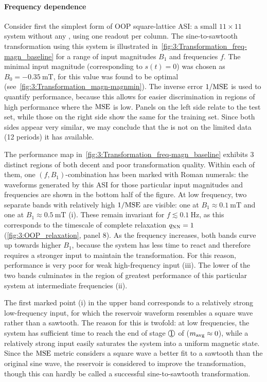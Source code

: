\paragraph{Frequency dependence}
Consider first the simplest form of OOP square-lattice ASI: a small $11 \times 11$ system without any , using one readout per column.
The sine-to-sawtooth transformation using this system is illustrated in~\cref{fig:3:Transformation_freq-magn_baseline} for a range of input magnitudes $B_1$ and frequencies $f$.
The minimal input magnitude (corresponding to $s(t) = 0$) was chosen as $B_0 = \SI{-0.35}{\milli\tesla}$, for this value was found to be optimal (see~\cref{fig:3:Transformation_magn-magnmin}).
The inverse error $1/\mathrm{MSE}$ is used to quantify performance, because this allows for easier discrimination in regions of high performance where the $\mathrm{MSE}$ is low.
Panels on the left side relate to the test set, while those on the right side show the same for the training set.
Since both sides appear very similar, we may conclude that the  is not  on the limited data (12 periods) it has available. \par
The performance map in~\cref{fig:3:Transformation_freq-magn_baseline} exhibits 3 distinct regions of both decent and poor transformation quality.
Within each of them, one $(f, B_1)$-combination has been marked with Roman numerals: the waveforms generated by this ASI for those particular input magnitudes and frequencies are shown in the bottom half of the figure.
At low frequency, two separate bands with relatively high $1/\mathrm{MSE}$ are visible: one at $B_1 \approx \SI{0.1}{\milli\tesla}$  and one at $B_1 \approx \SI{0.5}{\milli\tesla}$ \textsf{(i)}.
These remain invariant for $f \lesssim \SI{0.1}{\hertz}$, as this corresponds to the timescale of complete relaxation $q_\mathrm{NN} = 1$ (\cref{fig:3:OOP_relaxation}, panel 8).
As the frequency increases, both bands curve up towards higher $B_1$, because the system has less time to react and therefore requires a stronger input to maintain the transformation.
For this reason, performance is very poor for weak high-frequency input \textsf{(iii)}.
The lower of the two bands culminates in the region of greatest performance of this particular system at intermediate frequencies \textsf{(ii)}. \par %
The first marked point \textsf{(i)} in the upper band corresponds to a relatively strong low-frequency input, for which the reservoir waveform resembles a square wave rather than a sawtooth.
The reason for this is twofold: at low frequencies, the system has sufficient time to reach the end of stage $\circled{1}$ of  ($m_\mathrm{avg} \approx 0$), while a relatively strong input easily saturates the system into a uniform magnetic state. %
Since the $\mathrm{MSE}$ metric considers a square wave a better fit to a sawtooth than the original sine wave, the reservoir is considered to improve the transformation, though this can hardly be called a successful sine-to-sawtooth transformation.

